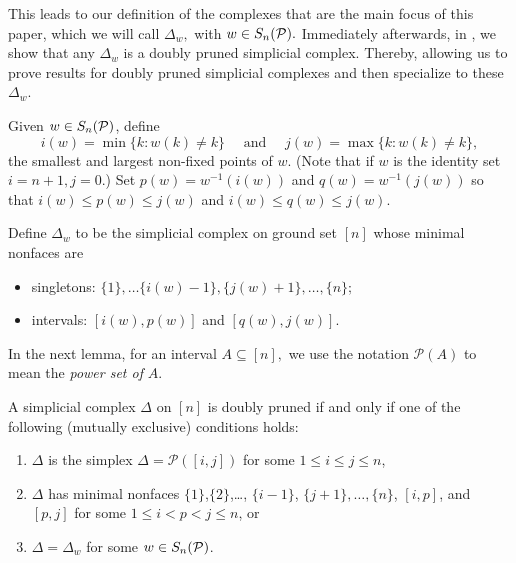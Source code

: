 This leads to our definition of the complexes that are the main focus of this paper, which we will call $\Delta_w,$ with $w\in S_n(\mathcal{P}).$ Immediately afterwards, in , we show that any $\Delta_w$ is a doubly pruned simplicial complex. Thereby, allowing us to prove results for doubly pruned simplicial complexes and then specialize to these $\Delta_w.$

\begin{definition}
\label{def:Deltaw}
    Given $w\in S_n(\mathcal{P})$, define
    \[
    i(w) = \min\{k:w(k)\neq k\}\quad\text{ and }\quad j(w) =\max\{k:w(k)\neq k\},
    \]
    the smallest and largest non-fixed points of $w$. (Note that if $w$ is the identity set $i = n+1, j = 0.$) Set $p(w) = w^{-1}(i(w))$ and $q(w) = w^{-1}(j(w))$ so that $i(w)\leq p(w)\leq j(w)$ and $i(w)\leq q(w)\leq j(w)$.
    
    Define $\Delta_w$ to be the simplicial complex on ground set $[n]$ whose minimal nonfaces are
\begin{itemize}
    \item singletons: $\{1\},\ldots\{i(w)-1\},\{j(w)+1\},\ldots,\{n\};$
    \item intervals: $[i(w),p(w)]$ and $[q(w),j(w)].$
\end{itemize}
\end{definition}
In the next lemma, for an interval $A\subseteq[n],$ we use the notation $\mathscr{P}(A)$ to mean the \emph{power set of} $A.$
\begin{lemma}
\label{lem: doubly pruned complexes are Schubert complexes}
    A  simplicial complex $\Delta$ on $[n]$ is doubly pruned if and only if one of the following (mutually exclusive) conditions holds:
    \begin{enumerate}[(1)]
        \item $\Delta$ is the simplex $\Delta = \mathscr{P}([i,j])$ for some $1\leq i\leq j\leq n$,
        \item $\Delta$ has minimal nonfaces $\{1\}$,$\{2\}$,\dots, $\{i-1\}$, $\{j+1\},\dots, \{n\}$, $[i,p]$, and $[p,j]$ for some $1\leq i<p<j\leq n$, or
        \item $\Delta = \Delta_w$ for some $w\in S_n(\mathcal{P})$.
    \end{enumerate}
\end{lemma}
